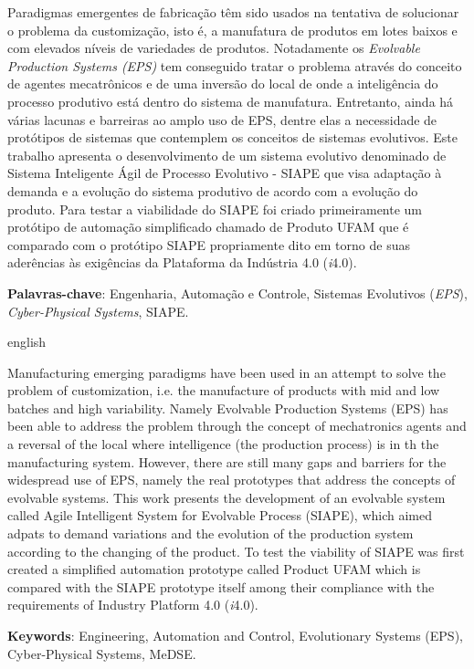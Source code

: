 \documentclass[
12pt,				%
openright,			%
oneside,			%
a4paper,			%
english,			%
brazil				%
]{abntex2}
\newcommand{\iQuatroZero}{\textit{i}4.0}
\begin{document}
\setlength{\absparsep}{18pt} %
\begin{resumo}
Paradigmas emergentes de fabricação têm sido usados na tentativa de solucionar o problema da customização, isto é, a manufatura de produtos em lotes baixos e com elevados níveis de variedades de produtos. Notadamente os \textit{Evolvable Production Systems (EPS)} tem conseguido tratar o problema através do conceito de agentes mecatrônicos e de uma inversão do local de onde a inteligência do processo produtivo está dentro do sistema de manufatura. Entretanto, ainda há várias lacunas e barreiras ao amplo uso de EPS, dentre elas a necessidade de protótipos de sistemas que contemplem os conceitos de sistemas evolutivos. Este trabalho apresenta o desenvolvimento de um sistema evolutivo denominado de Sistema Inteligente Ágil de Processo Evolutivo - SIAPE que visa adaptação à demanda e a evolução do sistema produtivo de acordo com a evolução do produto. Para testar a viabilidade do SIAPE foi criado primeiramente um protótipo de automação simplificado chamado de Produto UFAM que é comparado com o protótipo SIAPE propriamente dito em torno de suas aderências às exigências da Plataforma da Indústria 4.0 (\iQuatroZero).

 \textbf{Palavras-chave}: Engenharia, Automação e Controle,  Sistemas Evolutivos (\textit{EPS}), \textit{Cyber-Physical Systems}, SIAPE.
\end{resumo}

\begin{resumo}[Abstract]
	\begin{otherlanguage*}{english}

Manufacturing emerging paradigms have been used in an attempt to solve the problem of customization, i.e. the manufacture of products with mid and low batches and high variability. Namely Evolvable Production Systems (EPS) has been able to address the problem through the concept of mechatronics agents and a reversal of the local where intelligence (the production process) is in th the manufacturing system. However, there are still many gaps and barriers for the widespread use of EPS, namely the real prototypes that address the concepts of evolvable systems. This work presents the development of an evolvable system called Agile Intelligent System for Evolvable Process (SIAPE), which aimed adpats to demand variations and the evolution of the production system according to the changing of the product. To test the viability of SIAPE was first created a simplified automation prototype called Product UFAM which is compared with the SIAPE prototype itself among their compliance with the requirements of Industry Platform 4.0 (\iQuatroZero).

   \textbf{Keywords}: Engineering, Automation and Control, Evolutionary Systems (EPS), Cyber-Physical Systems, MeDSE.
   
 \end{otherlanguage*}
\end{resumo}
\cleardoublepage
\listoffigures*
\cleardoublepage
\end{document}
